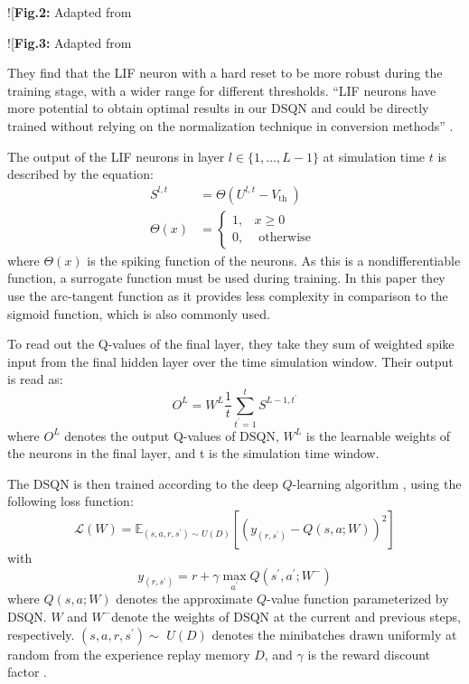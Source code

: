 \documentclass[
]{article}
\begin{document}
!{[}\textbf{Fig.2:} Adapted from
\href{image-20230227160506589.png}{\autocite{liuHumanLevelControlDirectly2022}}

!{[}\textbf{Fig.3:} Adapted from
\href{image-20230227160709544.png}{\autocite{liuHumanLevelControlDirectly2022}}

They find that the LIF neuron with a hard reset to be more robust during
the training stage, with a wider range for different thresholds. ``LIF
neurons have more potential to obtain optimal results in our DSQN and
could be directly trained without relying on the normalization technique
in conversion methods''
\autocite{liuHumanLevelControlDirectly2022}.

The output of the LIF neurons in layer \(l \in\{1, \ldots, L-1\}\) at
simulation time \(t\) is described by the equation: \[
\begin{aligned}
S^{l, t} & =\Theta\left(U^{l, t}-V_{\text {th }}\right) \\
\Theta(x) & = \begin{cases}1, & x \geq 0 \\
0, & \text { otherwise }\end{cases}
\end{aligned}
\] where \(\Theta(x)\) is the spiking function of the neurons. As this
is a nondifferentiable function, a surrogate function must be used
during training. In this paper they use the arc-tangent function as it
provides less complexity in comparison to the sigmoid function, which is
also commonly used.

To read out the Q-values of the final layer, they take they sum of
weighted spike input from the final hidden layer over the time
simulation window. Their output is read as:
\[O^L=W^L \frac{1}{t} \sum_{t^{\prime}=1}^t S^{L-1, t^{\prime}}\]where
\(O^L\) denotes the output Q-values of DSQN, \(W^L\) is the learnable
weights of the neurons in the final layer, and t is the simulation time
window.

The DSQN is then trained according to the deep \(Q\)-learning algorithm
\autocite{mnihHumanlevelControlDeep2015}, using the following
loss function: \[
 \mathcal{L}(W)=\mathbb{E}_{\left(s, a, r, s^{\prime}\right) \sim U(D)}\left[\left(y_{\left(r, s^{\prime}\right)}-Q(s, a ; W)\right)^2\right]
 \] with \[
 y_{\left(r, s^{\prime}\right)}=r+\gamma \max _{a^{\prime}} Q\left(s^{\prime}, a^{\prime} ; W^{-}\right)
 \] where \(Q(s, a ; W)\) denotes the approximate \(Q\)-value function
parameterized by DSQN. \(W\) and \(W^{-}\)denote the weights of DSQN at
the current and previous steps, respectively.
\(\left(s, a, r, s^{\prime}\right) \sim\) \(U(D)\) denotes the
minibatches drawn uniformly at random from the experience replay memory
\(D\), and \(\gamma\) is the reward discount factor
\autocite{liuHumanLevelControlDirectly2022}.
\end{document}
